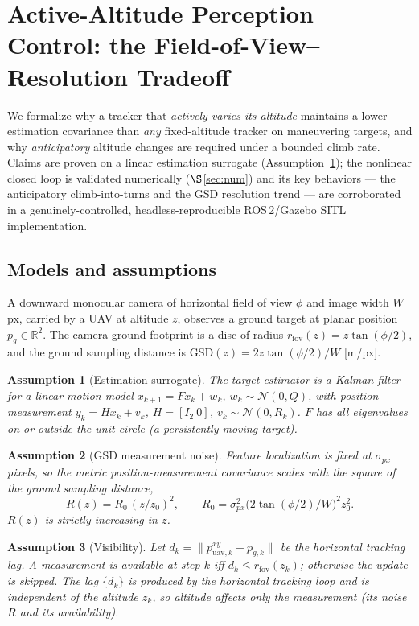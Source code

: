 \documentclass[10pt]{article}
\newtheorem{assumption}{Assumption}
\theoremstyle{remark}\newtheorem{remark}{Remark}
\newcommand{\Rset}{\mathbb{R}}
\begin{document}
\section*{Active-Altitude Perception Control: the Field-of-View--Resolution Tradeoff}

We formalize why a tracker that \emph{actively varies its altitude} maintains a lower
estimation covariance than \emph{any} fixed-altitude tracker on maneuvering targets, and
why \emph{anticipatory} altitude changes are required under a bounded climb rate. Claims
are proven on a linear estimation surrogate (Assumption~\ref{as:lin}); the nonlinear
closed loop is validated numerically ($\S$\ref{sec:num}) and its key behaviors --- the
anticipatory climb-into-turns and the GSD resolution trend --- are corroborated in a
genuinely-controlled, headless-reproducible ROS\,2/Gazebo SITL implementation.

\subsection*{Models and assumptions}

A downward monocular camera of horizontal field of view $\phi$ and image width $W$ px,
carried by a UAV at altitude $z$, observes a ground target at planar position
$p_g\in\Rset^2$. The camera ground footprint is a disc of radius
$r_{\mathrm{fov}}(z)=z\tan(\phi/2)$, and the ground sampling distance is
$\mathrm{GSD}(z)=2z\tan(\phi/2)/W$ [m/px].

\begin{assumption}[Estimation surrogate]\label{as:lin}
The target estimator is a Kalman filter for a linear motion model
$x_{k+1}=Fx_k+w_k$, $w_k\sim\mathcal N(0,Q)$, with position measurement
$y_k=Hx_k+v_k$, $H=[I_2\ 0]$, $v_k\sim\mathcal N(0,R_k)$. $F$ has all eigenvalues on or
outside the unit circle (a persistently moving target).
\end{assumption}

\begin{assumption}[GSD measurement noise]\label{as:gsd}
Feature localization is fixed at $\sigma_{px}$ pixels, so the metric position-measurement
covariance scales with the square of the ground sampling distance,
\[
R(z)=R_0\,(z/z_0)^2,\qquad R_0=\sigma_{px}^2\big(2\tan(\phi/2)/W\big)^2 z_0^2 .
\]
$R(z)$ is strictly increasing in $z$.
\end{assumption}

\begin{assumption}[Visibility]\label{as:vis}
Let $d_k=\lVert p^{xy}_{\mathrm{uav},k}-p_{g,k}\rVert$ be the horizontal tracking lag. A
measurement is available at step $k$ iff $d_k\le r_{\mathrm{fov}}(z_k)$; otherwise the update is
skipped. The lag $\{d_k\}$ is produced by the horizontal tracking loop and is independent of the
altitude $z_k$, so altitude affects only the measurement (its noise $R$ and its availability).
\end{assumption}
\end{document}
